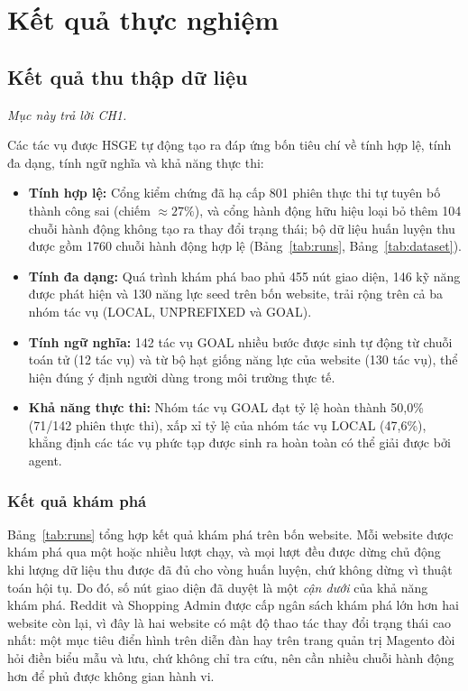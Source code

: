 \section{Kết quả thực nghiệm}
\label{sec:exp-results}

\subsection{Kết quả thu thập dữ liệu}
\label{sec:exp-data}

\noindent\emph{Mục này trả lời CH1.}

Các tác vụ được HSGE tự động tạo ra đáp ứng bốn tiêu chí về tính hợp lệ, tính đa dạng, tính ngữ nghĩa và khả năng thực thi:

\begin{itemize}
  \item \textbf{Tính hợp lệ:} Cổng kiểm chứng đã hạ cấp 801 phiên thực thi tự tuyên bố thành công sai (chiếm $\approx 27\%$), và cổng hành động hữu hiệu loại bỏ thêm 104 chuỗi hành động không tạo ra thay đổi trạng thái; bộ dữ liệu huấn luyện thu được gồm 1760 chuỗi hành động hợp lệ (Bảng~\ref{tab:runs}, Bảng~\ref{tab:dataset}).
  \item \textbf{Tính đa dạng:} Quá trình khám phá bao phủ 455 nút giao diện, 146 kỹ năng được phát hiện và 130 năng lực seed trên bốn website, trải rộng trên cả ba nhóm tác vụ (LOCAL, UNPREFIXED và GOAL).
  \item \textbf{Tính ngữ nghĩa:} 142 tác vụ GOAL nhiều bước được sinh tự động từ chuỗi toán tử (12 tác vụ) và từ bộ hạt giống năng lực của website (130 tác vụ), thể hiện đúng ý định người dùng trong môi trường thực tế.
  \item \textbf{Khả năng thực thi:} Nhóm tác vụ GOAL đạt tỷ lệ hoàn thành 50{,}0\% (71/142 phiên thực thi), xấp xỉ tỷ lệ của nhóm tác vụ LOCAL (47{,}6\%), khẳng định các tác vụ phức tạp được sinh ra hoàn toàn có thể giải được bởi agent.
\end{itemize}

\subsubsection{Kết quả khám phá}
Bảng~\ref{tab:runs} tổng hợp kết quả khám phá trên bốn website. Mỗi website được khám phá qua một hoặc nhiều lượt chạy, và mọi lượt đều được dừng chủ động khi lượng dữ liệu thu được đã đủ cho vòng huấn luyện, chứ không dừng vì thuật toán hội tụ. Do đó, số nút giao diện đã duyệt là một \emph{cận dưới} của khả năng khám phá. Reddit và Shopping Admin được cấp ngân sách khám phá lớn hơn hai website còn lại, vì đây là hai website có mật độ thao tác thay đổi trạng thái cao nhất: một mục tiêu điển hình trên diễn đàn hay trên trang quản trị Magento đòi hỏi điền biểu mẫu và lưu, chứ không chỉ tra cứu, nên cần nhiều chuỗi hành động hơn để phủ được không gian hành vi.

